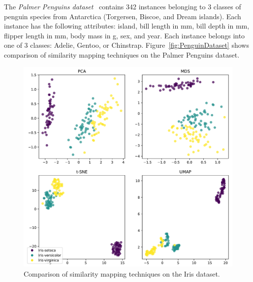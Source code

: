 The \emph{Palmer Penguins dataset}~\parencite{gorman2014ecological,
horst2020penguins} contains 342 instances belonging to 3 classes of
penguin species from Antarctica (Torgersen, Biscoe, and Dream islands).
Each instance has the following attributes: island, bill length in mm,
bill depth in mm, flipper length in mm, body mass in g, sex, and year.
Each instance belongs into one of 3 classes: Adelie, Gentoo, or Chinstrap.
Figure~\ref{fig:PenguinDataset} shows comparison of similarity mapping
techniques on the Palmer Penguins dataset.

\begin{figure}[tp]
\centering
\includegraphics[frame,keepaspectratio,width=\linewidth,height=\halfh]
{diagrams/iris.pdf}

\caption[Similarity Mapping on Iris dataset]
{
  Comparison of similarity mapping techniques on the Iris dataset.
}
\label{fig:IrisDataset}
\end{figure}


